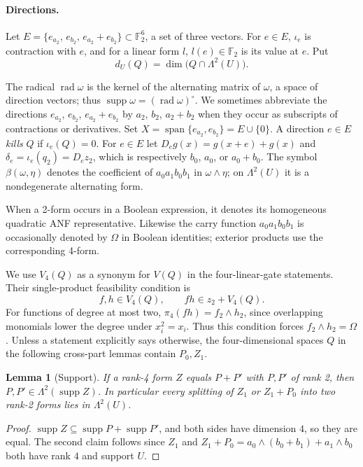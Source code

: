\documentclass[11pt,a4paper]{article}
\theoremstyle{plain}
\newtheorem{lemma}[theorem]{Lemma}
\theoremstyle{remark}
\newcommand{\F}{\mathbb F_2}
\newcommand{\Span}{\operatorname{span}}
\newcommand{\supp}{\operatorname{supp}}
\newcommand{\rad}{\operatorname{rad}}
\newcommand{\Lam}{\Lambda^2}
\newcommand{\dU}{d_U}
\newcommand{\Dir}{E}
\begin{document}
\paragraph{Directions.} Let $\Dir=\{e_{a_2},\,e_{b_2},\,e_{a_2}+e_{b_2}\}\subset\F^6$, a set of three vectors. For $e\in\Dir$, $\iota_e$ is contraction with $e$, and for a linear form $l$, $l(e)\in\F$ is its value at $e$. Put
\[
  \dU(Q)=\dim\bigl(Q\cap\Lam(U)\bigr).
\]


The radical $\rad\omega$ is the kernel of the alternating matrix of $\omega$, a space of direction vectors; thus $\supp\omega=(\rad\omega)^\circ$. We sometimes abbreviate the directions $e_{a_2}$, $e_{b_2}$, $e_{a_2}+e_{b_2}$ by $a_2$, $b_2$, $a_2+b_2$ when they occur as subscripts of contractions or derivatives. Set $X=\Span\{e_{a_2},e_{b_2}\}=E\cup\{0\}$. A direction $e\in E$ \emph{kills} $Q$ if $\iota_e(Q)=0$.
For $e\in E$ let $D_eg(x)=g(x+e)+g(x)$ and $\delta_e=\iota_e(q_2)=D_ez_2$, which is respectively $b_0$, $a_0$, or $a_0+b_0$.
The symbol $\beta(\omega,\eta)$ denotes the coefficient of $a_0a_1b_0b_1$ in $\omega\wedge\eta$; on $\Lam(U)$ it is a nondegenerate alternating form.

When a 2-form occurs in a Boolean expression, it denotes its homogeneous quadratic ANF representative. Likewise the carry function $a_0a_1b_0b_1$ is occasionally denoted by $\Omega$ in Boolean identities; exterior products use the corresponding 4-form.

We use $V_4(Q)$ as a synonym for $V(Q)$ in the four-linear-gate statements. Their single-product feasibility condition is
\begin{equation}\label{l4:eq:star}
 f,h\in V_4(Q),\qquad fh\in z_2+V_4(Q).
\end{equation}
For functions of degree at most two, $\pi_4(fh)=f_2\wedge h_2$, since overlapping monomials lower the degree under $x_i^2=x_i$. Thus this condition forces $f_2\wedge h_2=\Omega$.
Unless a statement explicitly says otherwise, the four-dimensional spaces $Q$ in the following cross-part lemmas contain $P_0,Z_1$.

\begin{lemma}[Support]\label{l4:lem:support}
If a rank-4 form $Z$ equals $P+P'$ with $P,P'$ of rank 2, then $P,P'\in\Lam(\supp Z)$. In particular every splitting of $Z_1$ or $Z_1+P_0$ into two rank-2 forms lies in $\Lam(U)$.
\end{lemma}

\begin{proof}
$\supp Z\subseteq\supp P+\supp P'$, and both sides have dimension $4$, so they are equal. The second claim follows since $Z_1$ and $Z_1+P_0=a_0\wedge(b_0+b_1)+a_1\wedge b_0$ both have rank $4$ and support $U$.
\end{proof}
\end{document}
